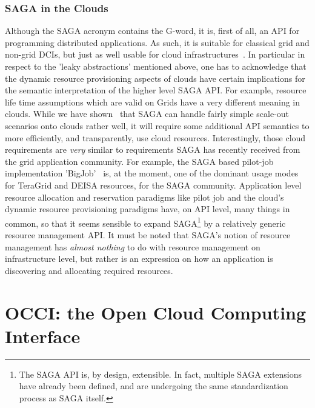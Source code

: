 \documentclass[10pt,conference,final,letterpaper,twoside,twocolumn,]{IEEEtran}
\newcommand{\I}[1]{\textit{#1}}
\begin{document}
 \subsubsection*{SAGA in the Clouds}

  Although the SAGA acronym contains the G-word, it is, first of all,
  an API for programming distributed applications.  As such, it is
  suitable for classical grid and non-grid DCIs, but just as well
  usable for cloud infrastructures~\cite{sagacloud...}.  In particular
  in respect to the 'leaky abstractions' mentioned above, one has to
  acknowledge that the dynamic resource provisioning aspects of clouds
  have certain implications for the semantic interpretation of the
  higher level SAGA API.  For example, resource life time assumptions
  which are valid on Grids have a very different meaning in clouds.
  While we have shown~\cite{sagacloud...} that SAGA can handle fairly
  simple scale-out scenarios onto clouds rather well, it will require
  some additional API semantics to more efficiently, and
  transparently, use cloud resources.  Interestingly, those cloud
  requirements are \I{very} similar to requirements SAGA has recently
  received from the grid application community.  For example, the SAGA
  based pilot-job implementation 'BigJob'~\cite{bigjob} is, at the
  moment, one of the dominant usage modes for TeraGrid and DEISA
  resources, for the SAGA community.  Application level resource
  allocation and reservation paradigms like pilot job and the cloud's
  dynamic resource provisioning paradigms have, on API level, many
  things in common, so that it seems sensible to expand
  SAGA\footnote{The SAGA API is, by design, extensible.  In fact,
  multiple SAGA extensions have already been defined, and are
  undergoing the same standardization process as SAGA itself.} by a
  relatively generic resource management API.  It must be noted that
  SAGA's notion of resource management has \I{almost nothing} to do
  with resource management on infrastructure level, but rather is an
  expression on how an application is discovering and allocating
  required resources.
  

\section{OCCI: the Open Cloud Computing Interface}
\label{sec:occi}
\end{document}
